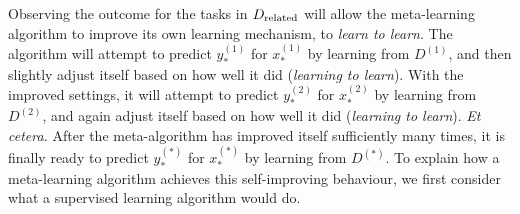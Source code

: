 \documentclass[12pt, twoside]{report}
\begin{document}
Observing the outcome for
the tasks in $D\ss{related}$ will allow the meta-learning algorithm to improve its own learning mechanism, to \emph{learn to learn}.
The algorithm will attempt to predict $\displaystyle y^{(1)}_*$
for $\displaystyle x^{(1)}_*$ by learning from $\displaystyle D^{(1)}$,
and then slightly adjust itself based on how well it did (\emph{learning to learn}).
With the improved settings, it will attempt to predict $\displaystyle y^{(2)}_*$
for $\displaystyle x^{(2)}_*$
by learning from $\displaystyle D^{(2)}$,
and again adjust itself based on how well it did (\emph{learning to learn}).
\textit{Et cetera.}
After the meta-algorithm has improved itself sufficiently many times, it is finally ready to predict $\displaystyle y^{(*)}_*$ for $\displaystyle x_*^{(*)}$ by learning from $\displaystyle D^{(*)}$.
To explain how a meta-learning algorithm achieves this self-improving behaviour, we first consider what a supervised learning algorithm would do.
\end{document}
